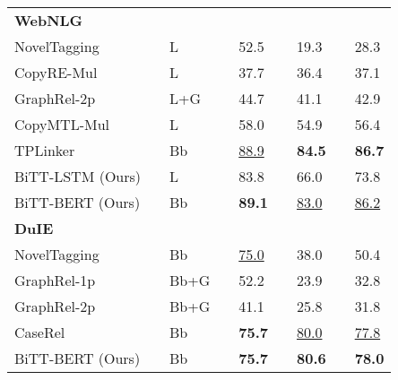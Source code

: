 \documentclass[conference]{IEEEtran}
\begin{document}
\begin{table}[t]
{\begin{tabular}{@{}lllllllll@{}}
    \textbf{WebNLG}  &  &         &  &               &  &               &  &               \\
    NovelTagging \cite{Zheng2017Joint} \textsuperscript{}     &  & L       &  & 52.5          &  & 19.3          &  & 28.3          \\
    CopyRE-Mul \cite{Zeng2018Extracting} \textsuperscript{}       &  & L       &  & 37.7          &  & 36.4          &  & 37.1          \\
    GraphRel-2p \cite{Fu2019Graphrel} \textsuperscript{}      &  & L+G     &  & 44.7          &  & 41.1          &  & 42.9          \\
    CopyMTL-Mul \cite{Zeng2020copymtl}      &  & L       &  & 58.0          &  & 54.9          &  & 56.4          \\
    TPLinker \cite{Wang2020TPLinker}         &  & Bb      &  & \underline{88.9}    &  & \textbf{84.5} &  & \textbf{86.7} \\ \midrule
    BiTT-LSTM (Ours)       &  & L       &  & 83.8          &  & 66.0          &  & 73.8          \\
    BiTT-BERT (Ours) &  & Bb      &  & \textbf{89.1} &  & \underline{83.0}    &  & \underline{86.2}    \\ \midrule
    \textbf{DuIE}    &  &         &  &               &  &               &  &               \\
    NovelTagging \cite{Zheng2017Joint} \textsuperscript{}     &  & Bb      &  & \underline{75.0}    &  & 38.0          &  & 50.4          \\
    GraphRel-1p \cite{Fu2019Graphrel} \textsuperscript{}      &  & Bb+G    &  & 52.2          &  & 23.9          &  & 32.8          \\
    GraphRel-2p \cite{Fu2019Graphrel} \textsuperscript{}      &  & Bb+G    &  & 41.1          &  & 25.8          &  & 31.8          \\
    CaseRel \cite{Wei2020CasRel} \textsuperscript{}          &  & Bb      &  & \textbf{75.7} &  & \underline{80.0}    &  & \underline{77.8}    \\ \midrule
    BiTT-BERT (Ours) &  & Bb      &  & \textbf{75.7} &  & \textbf{80.6} &  & \textbf{78.0} \\ \bottomrule
    \end{tabular}}
\end{table}
\end{document}
